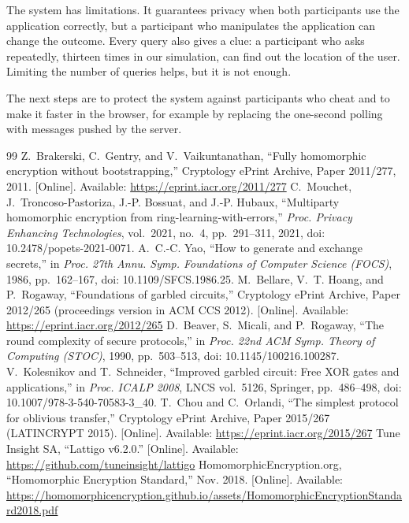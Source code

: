 \documentclass[conference,letterpaper]{IEEEtran}
\begin{document}
The system has limitations. It guarantees privacy when both participants use the application correctly, but a participant who manipulates the application can change the outcome. Every query also gives a clue: a participant who asks repeatedly, thirteen times in our simulation, can find out the location of the user. Limiting the number of queries helps, but it is not enough.

The next steps are to protect the system against participants who cheat and to make it faster in the browser, for example by replacing the one-second polling with messages pushed by the server.

\begin{thebibliography}{99}
 Z.~Brakerski, C.~Gentry, and V.~Vaikuntanathan, ``Fully homomorphic encryption without bootstrapping,'' Cryptology ePrint Archive, Paper 2011/277, 2011. [Online]. Available: \url{https://eprint.iacr.org/2011/277}
 C.~Mouchet, J.~Troncoso-Pastoriza, J.-P. Bossuat, and J.-P. Hubaux, ``Multiparty homomorphic encryption from ring-learning-with-errors,'' \emph{Proc. Privacy Enhancing Technologies}, vol.~2021, no.~4, pp.~291--311, 2021, doi: 10.2478/popets-2021-0071.
 A.~C.-C. Yao, ``How to generate and exchange secrets,'' in \emph{Proc. 27th Annu. Symp. Foundations of Computer Science (FOCS)}, 1986, pp.~162--167, doi: 10.1109/SFCS.1986.25.
 M.~Bellare, V.~T. Hoang, and P.~Rogaway, ``Foundations of garbled circuits,'' Cryptology ePrint Archive, Paper 2012/265 (proceedings version in ACM CCS 2012). [Online]. Available: \url{https://eprint.iacr.org/2012/265}
 D.~Beaver, S.~Micali, and P.~Rogaway, ``The round complexity of secure protocols,'' in \emph{Proc. 22nd ACM Symp. Theory of Computing (STOC)}, 1990, pp.~503--513, doi: 10.1145/100216.100287.
 V.~Kolesnikov and T.~Schneider, ``Improved garbled circuit: Free XOR gates and applications,'' in \emph{Proc. ICALP 2008}, LNCS vol.~5126, Springer, pp.~486--498, doi: 10.1007/978-3-540-70583-3\_40.
 T.~Chou and C.~Orlandi, ``The simplest protocol for oblivious transfer,'' Cryptology ePrint Archive, Paper 2015/267 (LATINCRYPT 2015). [Online]. Available: \url{https://eprint.iacr.org/2015/267}
 Tune Insight SA, ``Lattigo v6.2.0.'' [Online]. Available: \url{https://github.com/tuneinsight/lattigo}
 HomomorphicEncryption.org, ``Homomorphic Encryption Standard,'' Nov. 2018. [Online]. Available: \url{https://homomorphicencryption.github.io/assets/HomomorphicEncryptionStandard2018.pdf}

\end{thebibliography}
\end{document}
